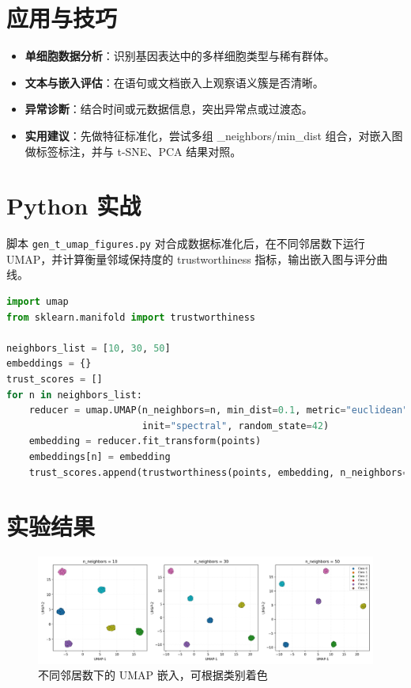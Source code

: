 \documentclass[UTF8,zihao=-4]{ctexart}
\begin{document}
\section{应用与技巧}
\begin{itemize}
  \item \textbf{单细胞数据分析}：识别基因表达中的多样细胞类型与稀有群体。
  \item \textbf{文本与嵌入评估}：在语句或文档嵌入上观察语义簇是否清晰。
  \item \textbf{异常诊断}：结合时间或元数据信息，突出异常点或过渡态。
  \item \textbf{实用建议}：先做特征标准化，尝试多组 
_neighbors/min_dist 组合，对嵌入图做标签标注，并与 t-SNE、PCA 结果对照。
\end{itemize}

\section{Python 实战}
脚本 \texttt{gen\_t\_umap\_figures.py} 对合成数据标准化后，在不同邻居数下运行 UMAP，并计算衡量邻域保持度的 trustworthiness 指标，输出嵌入图与评分曲线。
\begin{lstlisting}[language=Python,caption={脚本 gen_t_umap_figures.py 片段}]
import umap
from sklearn.manifold import trustworthiness

neighbors_list = [10, 30, 50]
embeddings = {}
trust_scores = []
for n in neighbors_list:
    reducer = umap.UMAP(n_neighbors=n, min_dist=0.1, metric="euclidean",
                        init="spectral", random_state=42)
    embedding = reducer.fit_transform(points)
    embeddings[n] = embedding
    trust_scores.append(trustworthiness(points, embedding, n_neighbors=15))
\end{lstlisting}

\section{实验结果}
\begin{figure}[H]
  \centering
  \includegraphics[width=0.82\linewidth]{umap_embeddings.png}
  \caption{不同邻居数下的 UMAP 嵌入，可根据类别着色}
  \label{fig:umap_embeddings_cn}
\end{figure}
\end{document}
